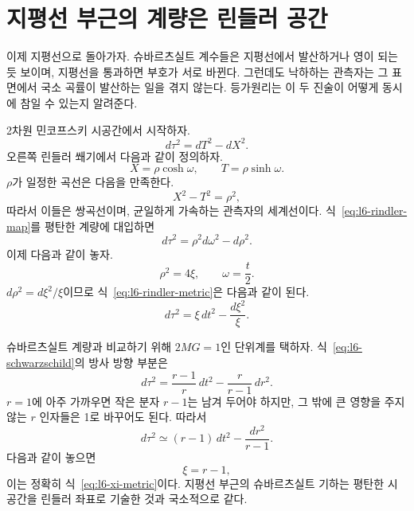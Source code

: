 \section{지평선 부근의 계량은 린들러 공간}

이제 지평선으로 돌아가자. 슈바르츠실트 계수들은 지평선에서 발산하거나 영이 되는 듯 보이며, 지평선을 통과하면 부호가 서로 바뀐다. 그런데도 낙하하는 관측자는 그 표면에서 국소 곡률이 발산하는 일을 겪지 않는다. 등가원리는 이 두 진술이 어떻게 동시에 참일 수 있는지 알려준다.

2차원 민코프스키 시공간에서 시작하자.
\begin{equation}
d\tau^{2}=dT^{2}-dX^{2}.
\end{equation}
오른쪽 린들러 쐐기에서 다음과 같이 정의하자.
\begin{equation}
X=\rho\cosh\omega,
\qquad
T=\rho\sinh\omega.
\label{eq:l6-rindler-map}
\end{equation}
\(\rho\)가 일정한 곡선은 다음을 만족한다.
\begin{equation}
X^{2}-T^{2}=\rho^{2},
\end{equation}
따라서 이들은 쌍곡선이며, 균일하게 가속하는 관측자의 세계선이다. 식~\eqref{eq:l6-rindler-map}를 평탄한 계량에 대입하면
\begin{equation}
d\tau^{2}
=\rho^{2}d\omega^{2}-d\rho^{2}.
\label{eq:l6-rindler-metric}
\end{equation}
이제 다음과 같이 놓자.
\begin{equation}
\rho^{2}=4\xi,
\qquad
\omega=\frac{t}{2}.
\label{eq:l6-rindler-rescale}
\end{equation}
\(d\rho^{2}=d\xi^{2}/\xi\)이므로 식~\eqref{eq:l6-rindler-metric}은 다음과 같이 된다.
\begin{equation}
d\tau^{2}
=\xi\,dt^{2}-\frac{d\xi^{2}}{\xi}.
\label{eq:l6-xi-metric}
\end{equation}

\begin{classroomqa}
\end{classroomqa}

슈바르츠실트 계량과 비교하기 위해 \(2MG=1\)인 단위계를 택하자. 식~\eqref{eq:l6-schwarzschild}의 방사 방향 부분은
\begin{equation}
d\tau^{2}
=
\frac{r-1}{r}\,dt^{2}
-
\frac{r}{r-1}\,dr^{2}.
\end{equation}
\(r=1\)에 아주 가까우면 작은 분자 \(r-1\)는 남겨 두어야 하지만, 그 밖에 큰 영향을 주지 않는 \(r\) 인자들은 1로 바꾸어도 된다. 따라서
\begin{equation}
d\tau^{2}
\simeq
(r-1)\,dt^{2}
-
\frac{dr^{2}}{r-1}.
\end{equation}
다음과 같이 놓으면
\begin{equation}
\xi=r-1,
\end{equation}
이는 정확히 식~\eqref{eq:l6-xi-metric}이다. 지평선 부근의 슈바르츠실트 기하는 평탄한 시공간을 린들러 좌표로 기술한 것과 국소적으로 같다.

